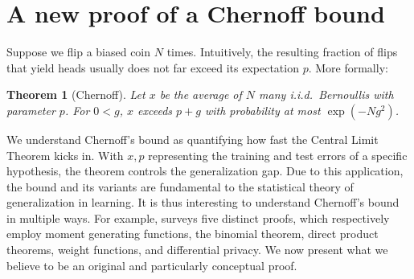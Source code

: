 \documentclass[openany, notitlepage, justified]{tufte-book}
\theoremstyle{plain}
\newtheorem{thm}{Theorem}
\theoremstyle{definition}
\begin{document}

    \section{A new proof of a Chernoff bound} \label{appendix:chernoff}
        
        Suppose we flip a biased coin $N$ times.  Intuitively, the resulting
        fraction of flips that yield heads usually does not far exceed its
        expectation $p$.  More formally: 
        \begin{thm}[Chernoff]
            Let $x$ be the average of $N$ many i.i.d.\ Bernoullis with
            parameter $p$.  For $0<g$, $x$ exceeds $p+g$ with probability
            at most $\exp(-Ng^2)$.
        \end{thm}
        We understand Chernoff's bound as quantifying how fast the Central
        Limit Theorem kicks in.  With $x, p$ representing the training and test
        errors of a specific hypothesis, the theorem controls the
        generalization gap.  Due to this application, the bound and
        its variants are fundamental to the statistical theory of
        generalization in learning.
        It is thus interesting to understand Chernoff's bound in multiple ways.
        For example, \citet{mu18} surveys five distinct proofs, which
        respectively employ
            moment generating functions,\cite[-3.4 cm]{be64}
            the binomial theorem,\cite[       -2.7 cm]{ch79}
            direct product theorems,\cite[    -1.65cm]{im10}
            weight functions,\cite[           -0.7 cm]{mu18} and
            differential privacy.\cite[       -0   cm]{st17}
        We now present what we believe to be an original and particularly
        conceptual proof.
\end{document}
